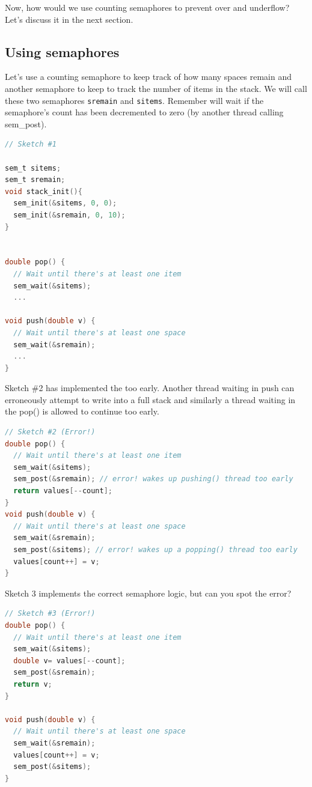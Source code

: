 Now, how would we use counting semaphores to prevent over and underflow?
Let's discuss it in the next section.

\subsection{Using semaphores}

Let's use a counting semaphore to keep track of how many spaces remain and another semaphore to keep to track the number of items in the stack.
We will call these two semaphores \texttt{sremain} and \texttt{sitems}.
Remember  will wait if the semaphore's count has been decremented to zero (by another thread calling sem\_post).

\begin{lstlisting}[language=C]
// Sketch #1

sem_t sitems;
sem_t sremain;
void stack_init(){
  sem_init(&sitems, 0, 0);
  sem_init(&sremain, 0, 10);
}


double pop() {
  // Wait until there's at least one item
  sem_wait(&sitems);
  ...

void push(double v) {
  // Wait until there's at least one space
  sem_wait(&sremain);
  ...
}
\end{lstlisting}

Sketch \#2 has implemented the  too early.
Another thread waiting in push can erroneously attempt to write into a full stack and similarly a thread waiting in the pop() is allowed to continue too early.

\begin{lstlisting}[language=C]
// Sketch #2 (Error!)
double pop() {
  // Wait until there's at least one item
  sem_wait(&sitems);
  sem_post(&sremain); // error! wakes up pushing() thread too early
  return values[--count];
}
void push(double v) {
  // Wait until there's at least one space
  sem_wait(&sremain);
  sem_post(&sitems); // error! wakes up a popping() thread too early
  values[count++] = v;
}
\end{lstlisting}

Sketch 3 implements the correct semaphore logic, but can you spot the error?

\begin{lstlisting}[language=C]
// Sketch #3 (Error!)
double pop() {
  // Wait until there's at least one item
  sem_wait(&sitems);
  double v= values[--count];
  sem_post(&sremain);
  return v;
}

void push(double v) {
  // Wait until there's at least one space
  sem_wait(&sremain);
  values[count++] = v;
  sem_post(&sitems);
}
\end{lstlisting}

